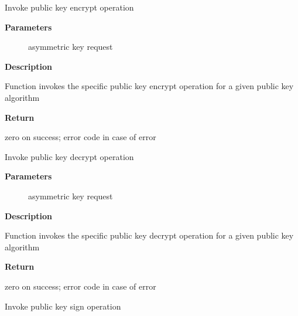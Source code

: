 \documentclass[a4paper,8pt,english]{sphinxmanual}
\begin{document}
\begin{fulllineitems}
\label{crypto/api-akcipher:c.crypto_akcipher_encrypt}
Invoke public key encrypt operation

\end{fulllineitems}


\textbf{Parameters}
\begin{description}
\item[{}] \leavevmode
asymmetric key request

\end{description}

\textbf{Description}

Function invokes the specific public key encrypt operation for a given
public key algorithm

\textbf{Return}

zero on success; error code in case of error

\begin{fulllineitems}
\label{crypto/api-akcipher:c.crypto_akcipher_decrypt}
Invoke public key decrypt operation

\end{fulllineitems}


\textbf{Parameters}
\begin{description}
\item[{}] \leavevmode
asymmetric key request

\end{description}

\textbf{Description}

Function invokes the specific public key decrypt operation for a given
public key algorithm

\textbf{Return}

zero on success; error code in case of error

\begin{fulllineitems}
\label{crypto/api-akcipher:c.crypto_akcipher_sign}
Invoke public key sign operation

\end{fulllineitems}
\end{document}
